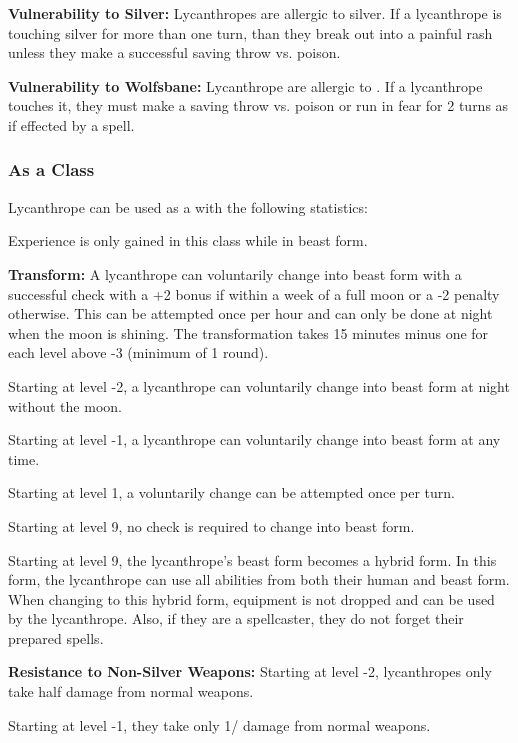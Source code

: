 \begin{multicols*}{2}
\textbf{Vulnerability to Silver:} Lycanthropes are allergic to silver. If a lycanthrope is touching silver for more than one turn, than they break out into a painful rash unless they make a successful saving throw vs. poison.

\textbf{Vulnerability to Wolfsbane:} Lycanthrope are allergic to . If a lycanthrope touches it, they must make a saving throw vs. poison or run in fear for 2 turns as if effected by a  spell. 

\subsubsection{As a Class}
Lycanthrope can be used as a  with the following statistics:

Experience is only gained in this class while in beast form.

\textbf{Transform:} A lycanthrope can voluntarily change into beast form with a successful  check with a +2 bonus if within a week of a full moon or a -2 penalty otherwise. This can be attempted once per hour and can only be done at night when the moon is shining. The transformation takes 15 minutes minus one for each level above -3 (minimum of 1 round).

Starting at level -2, a lycanthrope can voluntarily change into beast form at night without the moon.

Starting at level -1, a lycanthrope can voluntarily change into beast form at any time.

Starting at level 1, a voluntarily change can be attempted once per turn.

Starting at level 9, no  check is required to change into beast form.

Starting at level 9, the lycanthrope's beast form becomes a hybrid form. In this form, the lycanthrope can use all abilities from both their human and beast form. When changing to this hybrid form, equipment is not dropped and can be used by the lycanthrope. Also, if they are a spellcaster, they do not forget their prepared spells.

\textbf{Resistance to Non-Silver Weapons:} Starting at level -2, lycanthropes only take half damage from normal weapons.

Starting at level -1, they take only 1/ damage from normal weapons.


\end{multicols*}
